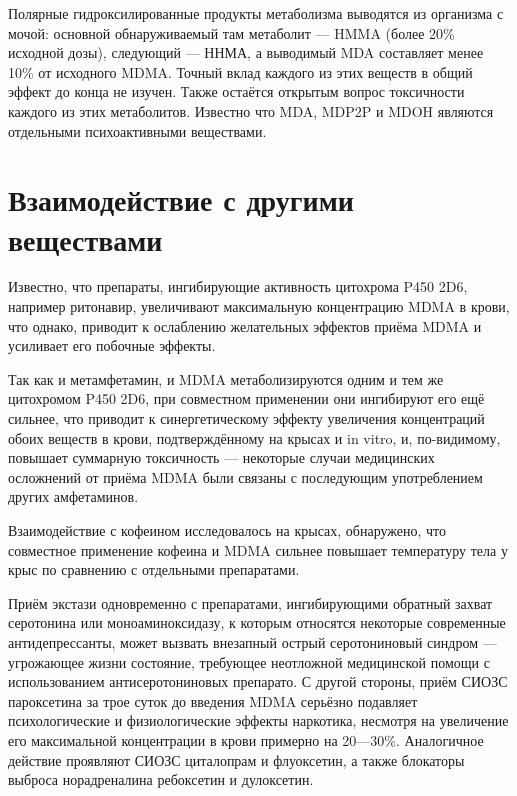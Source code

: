\documentclass[a4paper,14pt,russian]{report}
\begin{document}
Полярные гидроксилированные продукты метаболизма выводятся из организма с мочой: основной обнаруживаемый там метаболит — HMMA (более 20\% исходной дозы), следующий — ННМА, а выводимый MDA составляет менее 10\% от исходного MDMA. Точный вклад каждого из этих веществ в общий эффект до конца не изучен. Также остаётся открытым вопрос токсичности каждого из этих метаболитов. Известно что MDA, MDP2P и MDOH являются отдельными психоактивными веществами.

\section{Взаимодействие с другими веществами}

Известно, что препараты, ингибирующие активность цитохрома P450 2D6, например ритонавир, увеличивают максимальную концентрацию MDMA в крови, что однако, приводит к ослаблению желательных эффектов приёма MDMA и усиливает его побочные эффекты.

Так как и метамфетамин, и MDMA метаболизируются одним и тем же цитохромом P450 2D6, при совместном применении они ингибируют его ещё сильнее, что приводит к синергетическому эффекту увеличения концентраций обоих веществ в крови, подтверждённому на крысах и in vitro, и, по-видимому, повышает суммарную токсичность — некоторые случаи медицинских осложнений от приёма MDMA были связаны с последующим употреблением других амфетаминов.

Взаимодействие с кофеином исследовалось на крысах, обнаружено, что совместное применение кофеина и MDMA сильнее повышает температуру тела у крыс по сравнению с отдельными препаратами.

Приём экстази одновременно с препаратами, ингибирующими обратный захват серотонина или моноаминоксидазу, к которым относятся некоторые современные антидепрессанты, может вызвать внезапный острый серотониновый синдром — угрожающее жизни состояние, требующее неотложной медицинской помощи с использованием антисеротониновых препарато. С другой стороны, приём СИОЗС пароксетина за трое суток до введения MDMA серьёзно подавляет психологические и физиологические эффекты наркотика, несмотря на увеличение его максимальной концентрации в крови примерно на 20—30\%. Аналогичное действие проявляют СИОЗС циталопрам и флуоксетин, а также блокаторы выброса норадреналина ребоксетин и дулоксетин.
\end{document}
